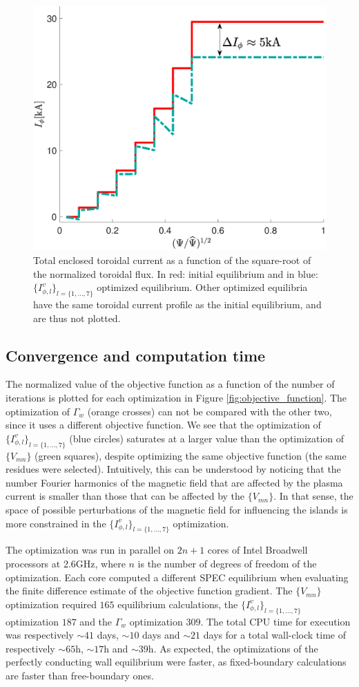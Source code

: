 \begin{figure}
    \centering
    \includegraphics[width=.45\textwidth]{main/Figures_Optimization/CurrentProfiles.pdf}
    \caption{Total enclosed toroidal current as a function of the square-root of the normalized toroidal flux. In red: initial equilibrium and in blue: $\{I^v_{\phi,l}\}_{l=\{1,\ldots,7\}}$ optimized equilibrium. Other optimized equilibria have the same toroidal current profile as the initial equilibrium, and are thus not plotted. }
    \label{fig:Iprofile}
\end{figure}





\subsection{Convergence and computation time}

The normalized value of the objective function as a function of the number of iterations is plotted for each optimization in Figure \ref{fig:objective_function}. The optimization of $\Gamma_w$ (orange crosses) can not be compared with the other two, since it uses a different objective function. We see that the optimization of $\{I^v_{\phi,l}\}_{l=\{1,\ldots,7\}}$ (blue circles) saturates at a larger value than the optimization of $\{V_{mn}\}$ (green squares), despite optimizing the same objective function (the same residues were selected). Intuitively, this can be understood by noticing that the number Fourier harmonics of the magnetic field that are affected by the plasma current is smaller than those that can be affected by the $\{V_{mn}\}$. In that sense, the space of possible perturbations of the magnetic field for influencing the islands is more constrained in the $\{I^v_{\phi,l}\}_{l=\{1,\ldots,7\}}$ optimization.

The optimization was run in parallel on $2n+1$ cores of Intel Broadwell processors at 2.6GHz, where $n$ is the number of degrees of freedom of the optimization. Each core computed a different SPEC equilibrium when evaluating the finite difference estimate of the objective function gradient. The $\{V_{mn}\}$ optimization required $165$ equilibrium calculations, the $\{I^v_{\phi,l}\}_{l=\{1,\ldots,7\}}$ optimization  $187$ and the $\Gamma_w$ optimization $309$. The total CPU time for execution was respectively $\sim41$ days, $\sim10$ days and $\sim21$ days for a total wall-clock time of respectively $\sim 65$h, $\sim 17$h and $\sim 39$h. As expected, the optimizations of the perfectly conducting wall equilibrium were faster, as fixed-boundary calculations are faster than free-boundary ones. 

